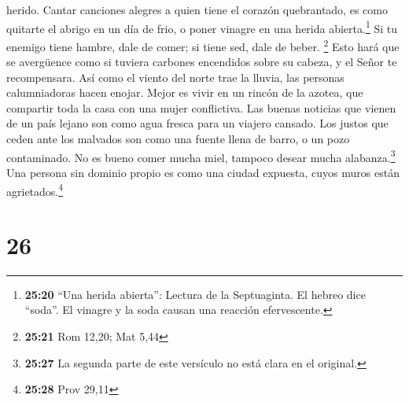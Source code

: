 herido.  Cantar canciones alegres a quien tiene el
corazón quebrantado, es como quitarte el abrigo en un día de frio, o
poner vinagre en una herida abierta.\footnote{\textbf{25:20} ``Una
  herida abierta'': Lectura de la Septuaginta. El hebreo dice ``soda''.
  El vinagre y la soda causan una reacción efervescente.}
 Si tu enemigo tiene hambre, dale de comer; si tiene sed,
dale de beber. \footnote{\textbf{25:21} Rom 12,20; Mat 5,44}
 Esto hará que se avergüence como si tuviera carbones
encendidos sobre su cabeza, y el Señor te recompensara. 
Así como el viento del norte trae la lluvia, las personas calumniadoras
hacen enojar.  Mejor es vivir en un rincón de la azotea,
que compartir toda la casa con una mujer conflictiva. 
Las buenas noticias que vienen de un país lejano son como agua fresca
para un viajero cansado.  Los justos que ceden ante los
malvados son como una fuente llena de barro, o un pozo contaminado.
 No es bueno comer mucha miel, tampoco desear mucha
alabanza.\footnote{\textbf{25:27} La segunda parte de este versículo no
  está clara en el original.}  Una persona sin dominio
propio es como una ciudad expuesta, cuyos muros están
agrietados.\footnote{\textbf{25:28} Prov 29,11}

\hypertarget{section-25}{%
\section{26}\label{section-25}}

